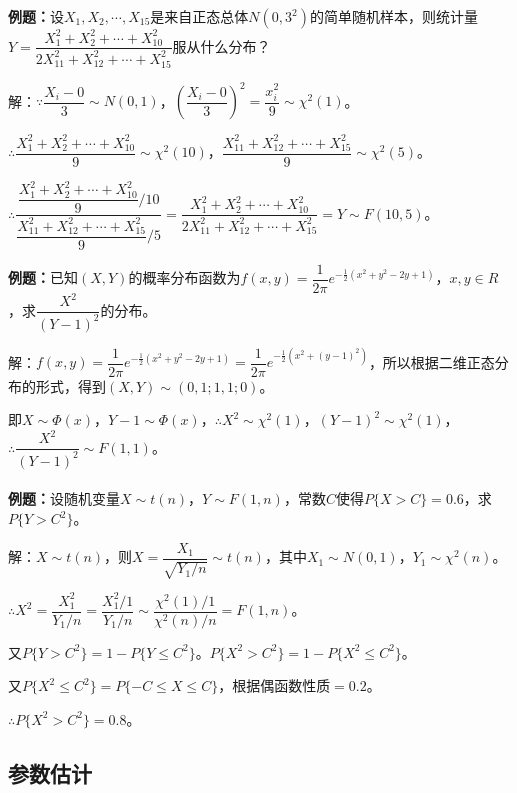 \textbf{例题：}设$X_1,X_2,\cdots,X_15$是来自正态总体$N(0,3^2)$的简单随机样本，则统计量$Y=\dfrac{X_1^2+X_2^2+\cdots+X_{10}^2}{2X_{11}^2+X_{12}^2+\cdots+X_{15}^2}$服从什么分布？

解：$\because\dfrac{X_i-0}{3}\sim N(0,1)$，$\left(\dfrac{X_i-0}{3}\right)^2=\dfrac{x_i^2}{9}\sim\chi^2(1)$。

$\therefore\dfrac{X_1^2+X_2^2+\cdots+X_{10}^2}{9}\sim\chi^2(10)$，$\dfrac{X_{11}^2+X_{12}^2+\cdots+X_{15}^2}{9}\sim\chi^2(5)$。

$\therefore\dfrac{\dfrac{X_1^2+X_2^2+\cdots+X_{10}^2}{9}/10}{\dfrac{X_{11}^2+X_{12}^2+\cdots+X_{15}^2}{9}/5}=\dfrac{X_1^2+X_2^2+\cdots+X_{10}^2}{2X_{11}^2+X_{12}^2+\cdots+X_{15}^2}=Y\sim F(10,5)$。

\textbf{例题：}已知$(X,Y)$的概率分布函数为$f(x,y)=\dfrac{1}{2\pi}e^{-\frac{1}{2}(x^2+y^2-2y+1)}$，$x,y\in R$，求$\dfrac{X^2}{(Y-1)^2}$的分布。

解：$f(x,y)=\dfrac{1}{2\pi}e^{-\frac{1}{2}(x^2+y^2-2y+1)}=\dfrac{1}{2\pi}e^{-\frac{1}{2}(x^2+(y-1)^2)}$，所以根据二维正态分布的形式，得到$(X,Y)\sim(0,1;1,1;0)$。

即$X\sim\varPhi(x)$，$Y-1\sim\varPhi(x)$，$\therefore X^2\sim\chi^2(1)$，$(Y-1)^2\sim\chi^2(1)$，$\therefore\dfrac{X^2}{(Y-1)^2}\sim F(1,1)$。

\paragraph{}

\textbf{例题：}设随机变量$X\sim t(n)$，$Y\sim F(1,n)$，常数$C$使得$P\{X>C\}=0.6$，求$P\{Y>C^2\}$。

解：$X\sim t(n)$，则$X=\dfrac{X_1}{\sqrt{Y_1/n}}\sim t(n)$，其中$X_1\sim N(0,1)$，$Y_1\sim\chi^2(n)$。

$\therefore X^2=\dfrac{X_1^2}{Y_1/n}=\dfrac{X_1^2/1}{Y_1/n}\sim\dfrac{\chi^2(1)/1}{\chi^2(n)/n}=F(1,n)$。

又$P\{Y>C^2\}=1-P\{Y\leqslant C^2\}$。$P\{X^2>C^2\}=1-P\{X^2\leqslant C^2\}$。

又$P\{X^2\leqslant C^2\}=P\{-C\leqslant X\leqslant C\}$，根据偶函数性质$=0.2$。

$\therefore P\{X^2>C^2\}=0.8$。

\subsection{参数估计}

\paragraph{}


